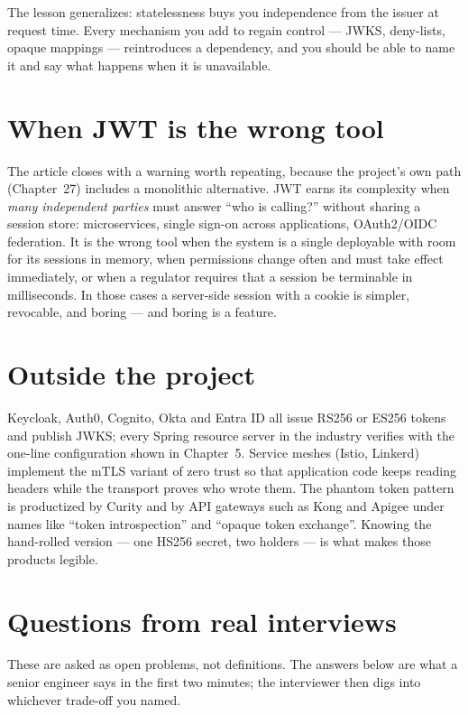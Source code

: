 The lesson generalizes: statelessness buys you independence from the
issuer at request time. Every mechanism you add to regain control ---
JWKS, deny-lists, opaque mappings --- reintroduces a dependency, and you
should be able to name it and say what happens when it is unavailable.

\section{When JWT is the wrong tool}

The article closes with a warning worth repeating, because the project's
own path (Chapter~27) includes a monolithic alternative. JWT earns its
complexity when \emph{many independent parties} must answer ``who is
calling?'' without sharing a session store: microservices, single
sign-on across applications, OAuth2/OIDC federation. It is the wrong
tool when the system is a single deployable with room for its sessions in
memory, when permissions change often and must take effect immediately,
or when a regulator requires that a session be terminable in
milliseconds. In those cases a server-side session with a cookie is
simpler, revocable, and boring --- and boring is a feature.

\section{Outside the project}

Keycloak, Auth0, Cognito, Okta and Entra ID all issue RS256 or ES256
tokens and publish JWKS; every Spring resource server in the industry
verifies with the one-line  configuration shown in
Chapter~5. Service meshes (Istio, Linkerd) implement the mTLS variant of
zero trust so that application code keeps reading headers while the
transport proves who wrote them. The phantom token pattern is
productized by Curity and by API gateways such as Kong and Apigee under
names like ``token introspection'' and ``opaque token exchange''. Knowing
the hand-rolled version --- one HS256 secret, two holders --- is what
makes those products legible.

\section{Questions from real interviews}

These are asked as open problems, not definitions. The answers below are
what a senior engineer says in the first two minutes; the interviewer
then digs into whichever trade-off you named.

